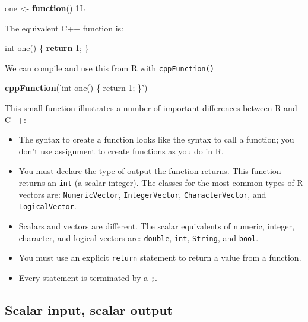 \documentclass[]{book}
\newenvironment{Shaded}{\begin{snugshade}}{\end{snugshade}}
\newcommand{\ControlFlowTok}[1]{\textcolor[rgb]{0.27,0.27,0.27}{\textbf{#1}}}
\newcommand{\DataTypeTok}[1]{\textcolor[rgb]{0.27,0.27,0.27}{#1}}
\newcommand{\DecValTok}[1]{\textcolor[rgb]{0.06,0.06,0.06}{#1}}
\newcommand{\KeywordTok}[1]{\textcolor[rgb]{0.27,0.27,0.27}{\textbf{#1}}}
\newcommand{\NormalTok}[1]{#1}
\newcommand{\StringTok}[1]{\textcolor[rgb]{0.5,0.5,0.5}{#1}}
\begin{document}
\begin{Shaded}
\begin{Highlighting}[]
\NormalTok{one <-}\StringTok{ }\ControlFlowTok{function}\NormalTok{() 1L}
\end{Highlighting}
\end{Shaded}

The equivalent C++ function is:

\begin{Shaded}
\begin{Highlighting}[]
\DataTypeTok{int}\NormalTok{ one() \{}
  \ControlFlowTok{return} \DecValTok{1}\NormalTok{;}
\NormalTok{\}}
\end{Highlighting}
\end{Shaded}

We can compile and use this from R with \texttt{cppFunction()}

\begin{Shaded}
\begin{Highlighting}[]
\KeywordTok{cppFunction}\NormalTok{(}\StringTok{'int one() \{}
\StringTok{  return 1;}
\StringTok{\}'}\NormalTok{)}
\end{Highlighting}
\end{Shaded}

This small function illustrates a number of important differences between R and C++:

\begin{itemize}
\item
  The syntax to create a function looks like the syntax to call a function;
  you don't use assignment to create functions as you do in R.
\item
  You must declare the type of output the function returns. This function
  returns an \texttt{int} (a scalar integer). The classes for the most common types
  of R vectors are: \texttt{NumericVector}, \texttt{IntegerVector}, \texttt{CharacterVector}, and
  \texttt{LogicalVector}.
\item
  Scalars and vectors are different. The scalar equivalents of numeric,
  integer, character, and logical vectors are: \texttt{double}, \texttt{int}, \texttt{String}, and
  \texttt{bool}.
\item
  You must use an explicit \texttt{return} statement to return a value from a
  function.
\item
  Every statement is terminated by a \texttt{;}.
\end{itemize}

\hypertarget{scalar-input-scalar-output}{%
\subsection{Scalar input, scalar output}\label{scalar-input-scalar-output}}
\end{document}
